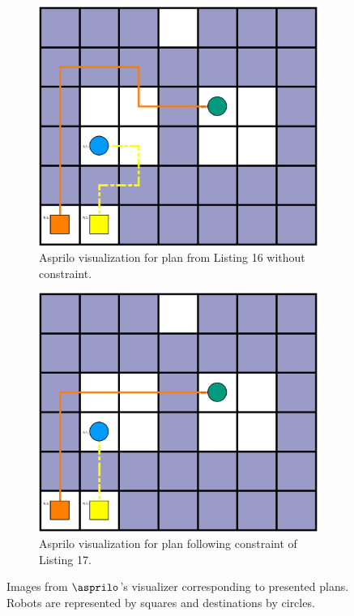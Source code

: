 \begin{figure}
    \centering
\begin{subfigure}{.45\textwidth}
    \centering
    \includegraphics[scale=0.2]{img/asprilo_nc.png}
    \caption{Asprilo visualization for plan from Listing 16 without constraint.}
\end{subfigure}%
\hspace{10px}
\begin{subfigure}{.45\textwidth}
    \centering
    \includegraphics[scale=0.2]{img/asprilo_ur.png}
    \caption{Asprilo visualization for plan following constraint of Listing 17.}
\end{subfigure}
\caption{Images from $\asprilo$'s visualizer corresponding to presented plans. Robots are represented by squares and destinations by circles.}
\end{figure}


